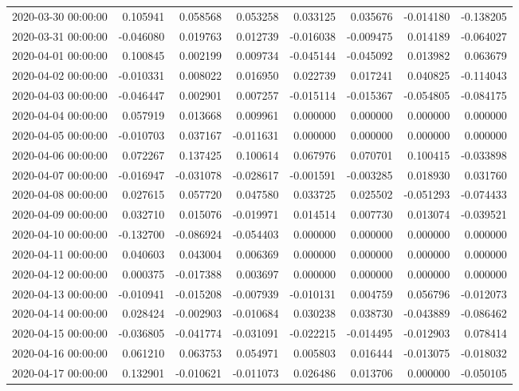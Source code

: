 \begin{tabular}{lrrrrrrr}
2020-03-30 00:00:00 & 0.105941 & 0.058568 & 0.053258 & 0.033125 & 0.035676 & -0.014180 & -0.138205 \\
2020-03-31 00:00:00 & -0.046080 & 0.019763 & 0.012739 & -0.016038 & -0.009475 & 0.014189 & -0.064027 \\
2020-04-01 00:00:00 & 0.100845 & 0.002199 & 0.009734 & -0.045144 & -0.045092 & 0.013982 & 0.063679 \\
2020-04-02 00:00:00 & -0.010331 & 0.008022 & 0.016950 & 0.022739 & 0.017241 & 0.040825 & -0.114043 \\
2020-04-03 00:00:00 & -0.046447 & 0.002901 & 0.007257 & -0.015114 & -0.015367 & -0.054805 & -0.084175 \\
2020-04-04 00:00:00 & 0.057919 & 0.013668 & 0.009961 & 0.000000 & 0.000000 & 0.000000 & 0.000000 \\
2020-04-05 00:00:00 & -0.010703 & 0.037167 & -0.011631 & 0.000000 & 0.000000 & 0.000000 & 0.000000 \\
2020-04-06 00:00:00 & 0.072267 & 0.137425 & 0.100614 & 0.067976 & 0.070701 & 0.100415 & -0.033898 \\
2020-04-07 00:00:00 & -0.016947 & -0.031078 & -0.028617 & -0.001591 & -0.003285 & 0.018930 & 0.031760 \\
2020-04-08 00:00:00 & 0.027615 & 0.057720 & 0.047580 & 0.033725 & 0.025502 & -0.051293 & -0.074433 \\
2020-04-09 00:00:00 & 0.032710 & 0.015076 & -0.019971 & 0.014514 & 0.007730 & 0.013074 & -0.039521 \\
2020-04-10 00:00:00 & -0.132700 & -0.086924 & -0.054403 & 0.000000 & 0.000000 & 0.000000 & 0.000000 \\
2020-04-11 00:00:00 & 0.040603 & 0.043004 & 0.006369 & 0.000000 & 0.000000 & 0.000000 & 0.000000 \\
2020-04-12 00:00:00 & 0.000375 & -0.017388 & 0.003697 & 0.000000 & 0.000000 & 0.000000 & 0.000000 \\
2020-04-13 00:00:00 & -0.010941 & -0.015208 & -0.007939 & -0.010131 & 0.004759 & 0.056796 & -0.012073 \\
2020-04-14 00:00:00 & 0.028424 & -0.002903 & -0.010684 & 0.030238 & 0.038730 & -0.043889 & -0.086462 \\
2020-04-15 00:00:00 & -0.036805 & -0.041774 & -0.031091 & -0.022215 & -0.014495 & -0.012903 & 0.078414 \\
2020-04-16 00:00:00 & 0.061210 & 0.063753 & 0.054971 & 0.005803 & 0.016444 & -0.013075 & -0.018032 \\
2020-04-17 00:00:00 & 0.132901 & -0.010621 & -0.011073 & 0.026486 & 0.013706 & 0.000000 & -0.050105 \\

\end{tabular}
